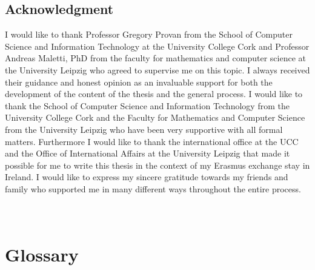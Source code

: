 \documentclass[a4paper,12pt]{report}
\begin{document}
\newpage
\begin{center}
\begin{minipage}{\textwidth}
\vspace{2cm}
\section*{Acknowledgment}

\vspace{1cm}


I would like to thank Professor Gregory Provan from the School of Computer Science and Information Technology at the University College Cork and Professor Andreas Maletti, PhD from the faculty for mathematics and computer science at the University Leipzig who agreed to supervise me on this topic. I always received their guidance and honest opinion as an invaluable support for both the development of the content of the thesis and the general process. I would like to thank the School of Computer Science and Information Technology from the University College Cork and the Faculty for Mathematics and Computer Science from the University Leipzig who have been very supportive with all formal matters. Furthermore I would like to thank the international office at the UCC and the Office of International Affairs at the University Leipzig that made it possible for me to write this thesis in the context of my Erasmus exchange stay in Ireland. I would like to express my sincere gratitude towards my friends and family who supported me in many different ways throughout the entire process. \\
\\
\\


\end{minipage}
\end{center}

\newpage

\chapter*{Glossary}
\end{document}
